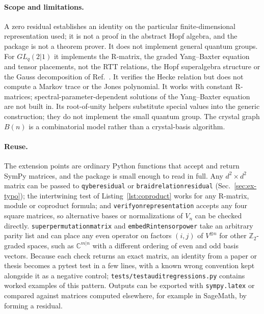 \documentclass{SciPost}
\newcommand{\code}[1]{\texttt{\begingroup\def\_{\textunderscore\allowbreak}#1\endgroup}}
\newcommand{\GL}{GL_q(2|1)}
\begin{document}
\paragraph{Scope and limitations.} A zero residual establishes an identity on the particular finite-dimensional representation used; it is not a proof in the abstract Hopf algebra, and the package is not a theorem prover. It does not implement general quantum groups. For $\GL$ it implements the R-matrix, the graded Yang--Baxter equation and tensor placements, not the RTT relations, the Hopf superalgebra structure or the Gauss decomposition of Ref.~\cite{celik2021}. It verifies the Hecke relation but does not compute a Markov trace or the Jones polynomial. It works with constant R-matrices; spectral-parameter-dependent solutions of the Yang--Baxter equation are not built in. Its root-of-unity helpers substitute special values into the generic construction; they do not implement the small quantum group. The crystal graph $B(n)$ is a combinatorial model rather than a crystal-basis algorithm.

\paragraph{Reuse.} The extension points are ordinary Python functions that accept and return SymPy matrices, and the package is small enough to read in full. Any $d^2\times d^2$ matrix can be passed to \code{qybe\_residual} or \code{braid\_relation\_residual} (Sec.~\ref{sec:ex-typo}); the intertwining test of Listing~\ref{lst:coproduct} works for any R-matrix, module or coproduct formula; and \code{verify\_on\_representation} accepts any four square matrices, so alternative bases or normalizations of $V_n$ can be checked directly. \code{super\_permutation\_matrix} and \code{embed\_R\_in\_tensor\_power} take an arbitrary parity list and can place any even operator on factors $(i,j)$ of $V^{\otimes n}$ for other $\mathbb{Z}_2$-graded spaces, such as $\mathbb{C}^{m|n}$ with a different ordering of even and odd basis vectors. Because each check returns an exact matrix, an identity from a paper or thesis becomes a pytest test in a few lines, with a known wrong convention kept alongside it as a negative control; \code{tests/test\_audit\_regressions.py} contains worked examples of this pattern. Outputs can be exported with \code{sympy.latex} or compared against matrices computed elsewhere, for example in SageMath, by forming a residual.
\end{document}
